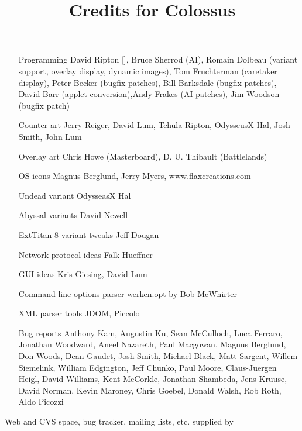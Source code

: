 \documentclass{article}
\begin{document}

\title{Credits for Colossus}

\maketitle

\begin{itemize}

\item[Programming] David Ripton [], Bruce Sherrod (AI), Romain Dolbeau (variant support, overlay display, dynamic images), Tom Fruchterman (caretaker display), Peter Becker (bugfix patches), Bill Barksdale (bugfix patches), David Barr (applet conversion),Andy Frakes (AI patches), Jim Woodson (bugfix patch)

\item[Counter art] Jerry Reiger, David Lum, Tchula Ripton, OdysseusX Hal, Josh Smith, John Lum

\item[Overlay art] Chris Howe (Masterboard), D. U. Thibault (Battlelands)

\item[OS icons] Magnus Berglund, Jerry Myers, www.flaxcreations.com

\item[Undead variant] OdysseasX Hal

\item[Abyssal variants] David Newell

\item[ExtTitan 8 variant tweaks] Jeff Dougan

\item[Network protocol ideas] Falk Hueffner

\item[GUI ideas] Kris Giesing, David Lum

\item[Command-line options parser] werken.opt by Bob McWhirter

\item[XML parser tools] JDOM, Piccolo

\item[Bug reports] Anthony Kam, Augustin Ku, Sean McCulloch, Luca Ferraro, Jonathan Woodward, Aneel Nazareth, Paul Macgowan, Magnus Berglund, Don Woods, Dean Gaudet, Josh Smith, Michael Black, Matt Sargent, Willem Siemelink, William Edgington, Jeff Chunko, Paul Moore, Claus-Juergen Heigl, David Williams, Kent McCorkle, Jonathan Shambeda, Jens Kruuse, David Norman, Kevin Maroney, Chris Goebel, Donald Walsh, Rob Roth, Aldo Picozzi


\end{itemize}

Web and CVS space, bug tracker, mailing lists, etc. supplied by 
\end{document}
